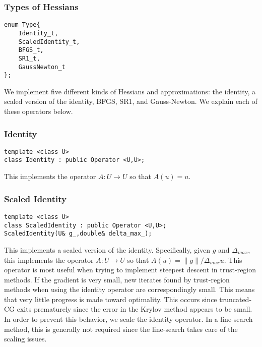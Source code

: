\documentclass{article}
\begin{document}
\subsubsection{Types of Hessians}

\begin{flushleft}
\begin{lstlisting}
enum Type{
    Identity_t,     
    ScaledIdentity_t,
    BFGS_t,          
    SR1_t,            
    GaussNewton_t      
};
\end{lstlisting}
\end{flushleft}

We implement five different kinds of Hessians and approximations: the identity, a scaled version of the identity, BFGS, SR1, and Gauss-Newton.  We explain each of these operators below.

\subsubsection{Identity}

\begin{flushleft}
\begin{lstlisting}
template <class U>
class Identity : public Operator <U,U>; 
\end{lstlisting}
\end{flushleft}

This implements the operator $A:U\rightarrow U$ so that $A(u)=u$.

\subsubsection{Scaled Identity}

\begin{flushleft}
\begin{lstlisting}
template <class U>
class ScaledIdentity : public Operator <U,U>;
ScaledIdentity(U& g_,double& delta_max_);
\end{lstlisting}
\end{flushleft}

This implements a scaled version of the identity.  Specifically, given $g$ and $\Delta_{max}$, this implements the operator $A:U\rightarrow U$ so that $A(u)=\|g\|/\Delta_{max} u$.  This operator is most useful when trying to implement steepest descent in trust-region methods.  If the gradient is very small, new iterates found by trust-region methods when using the identity operator are correspondingly small.  This means that very little progress is made toward optimality.  This occurs since truncated-CG exits prematurely since the error in the Krylov method appears to be small.  In order to prevent this behavior, we scale the identity operator.  In a line-search method, this is generally not required since the line-search takes care of the scaling issues.
\end{document}

